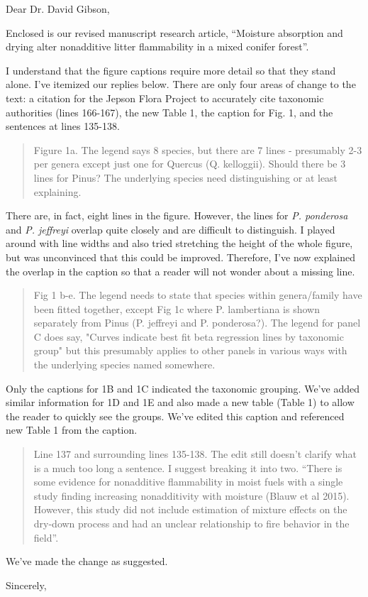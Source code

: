 \documentclass[letterpaper, 12pt]{letter}
\begin{document}
\begin{letter}{}

\opening{Dear Dr. David Gibson,}

Enclosed is our revised manuscript research article, ``Moisture absorption and
drying alter nonadditive litter flammability in a mixed conifer forest''.

I understand that the figure captions require more detail so that they stand
alone. I've itemized our replies below. There are only four areas of change to
the text: a citation for the Jepson Flora Project to accurately cite taxonomic
authorities (lines 166-167), the new Table 1, the caption for Fig. 1, and the
sentences at lines 135-138.

\begin{quote}
  Figure 1a. The legend says 8 species, but there are 7 lines - presumably 2-3
per genera except just one for Quercus (Q. kelloggii). Should there be 3 lines
for Pinus? The underlying species need distinguishing or at least explaining.
\end{quote}

There are, in fact, eight lines in the figure. However, the lines for \emph{P. ponderosa} and \emph{P. jeffreyi} overlap quite closely and are difficult to distinguish. I played around with line widths and also tried stretching the height of the whole figure, but was unconvinced that this could be improved. Therefore, I've now explained the overlap in the caption so that a reader will not wonder about a missing line.
  

\begin{quote}
  Fig 1 b-e. The legend needs to state that species within genera/family have
been fitted together, except Fig 1c where P. lambertiana is shown separately
from Pinus (P. jeffreyi and P. ponderosa?). The legend for panel C does say,
"Curves indicate best fit beta regression lines by taxonomic group" but this
presumably applies to other panels in various ways with the underlying species
named somewhere.
\end{quote}

Only the captions for 1B and 1C indicated the taxonomic grouping. We've added similar information for 1D and 1E and
also made a new table (Table 1) to allow the reader to quickly see the
groups. We've edited this caption and referenced new Table 1 from the caption.


\begin{quote}
Line 137 and surrounding lines 135-138. The edit still doesn't clarify what is
a much too long a sentence. I suggest breaking it into two. ``There is some
evidence for nonadditive flammability in moist fuels with a single study
finding increasing nonadditivity with moisture (Blauw et al 2015). However,
this study did not include estimation of mixture effects on the dry-down
process and had an unclear relationship to fire behavior in the field''.
\end{quote}

We've made the change as suggested.


\closing{Sincerely,}

\end{letter}
\end{document}
